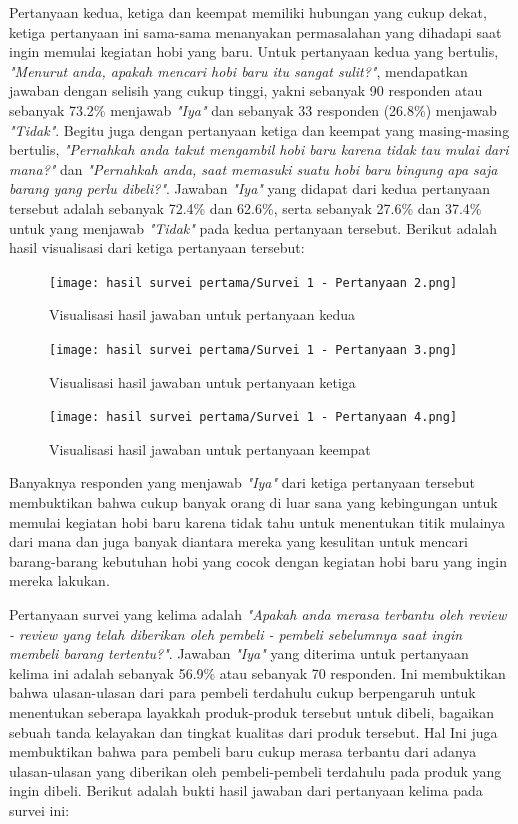 \documentclass[a4paper]{article}
\begin{document}
Pertanyaan kedua, ketiga dan keempat memiliki hubungan yang cukup dekat, ketiga pertanyaan ini sama-sama menanyakan permasalahan yang dihadapi saat ingin memulai kegiatan hobi yang baru. Untuk pertanyaan kedua yang bertulis, \textit{"Menurut anda, apakah mencari hobi baru itu sangat sulit?"}, mendapatkan jawaban dengan selisih yang cukup tinggi, yakni sebanyak 90 responden atau sebanyak 73.2\% menjawab \textit{"Iya"} dan sebanyak 33 responden (26.8\%) menjawab \textit{"Tidak"}. Begitu juga dengan pertanyaan ketiga dan keempat yang masing-masing bertulis, \textit{"Pernahkah anda takut mengambil hobi baru karena tidak tau mulai dari mana?"} dan \textit{"Pernahkah anda, saat memasuki suatu hobi baru bingung apa saja barang yang perlu dibeli?"}. Jawaban \textit{"Iya"} yang didapat dari kedua pertanyaan tersebut adalah sebanyak 72.4\% dan 62.6\%, serta sebanyak 27.6\% dan 37.4\% untuk yang menjawab \textit{"Tidak"} pada kedua pertanyaan tersebut. Berikut adalah hasil visualisasi dari ketiga pertanyaan tersebut:
\begin{figure}[h]
    \centering
    \texttt{[image: hasil survei pertama/Survei 1 - Pertanyaan 2.png]}
    \caption{Visualisasi hasil jawaban untuk pertanyaan kedua}
\end{figure}

\begin{figure}[h]
    \centering
    \texttt{[image: hasil survei pertama/Survei 1 - Pertanyaan 3.png]}
    \caption{Visualisasi hasil jawaban untuk pertanyaan ketiga}
\end{figure}

\begin{figure}[h]
    \centering
    \texttt{[image: hasil survei pertama/Survei 1 - Pertanyaan 4.png]}
    \caption{Visualisasi hasil jawaban untuk pertanyaan keempat}
\end{figure}
\newpage

Banyaknya responden yang menjawab \textit{"Iya"} dari ketiga pertanyaan tersebut membuktikan bahwa cukup banyak orang di luar sana yang kebingungan untuk memulai kegiatan hobi baru karena tidak tahu untuk menentukan titik mulainya dari mana dan juga banyak diantara mereka yang kesulitan untuk mencari barang-barang kebutuhan hobi yang cocok dengan kegiatan hobi baru yang ingin mereka lakukan.

Pertanyaan survei yang kelima adalah \textit{"Apakah anda merasa terbantu oleh review - review yang telah diberikan oleh pembeli - pembeli sebelumnya saat ingin membeli barang tertentu?"}. Jawaban \textit{"Iya"} yang diterima untuk pertanyaan kelima ini adalah sebanyak 56.9\% atau sebanyak 70 responden. Ini membuktikan bahwa ulasan-ulasan dari para pembeli terdahulu cukup berpengaruh untuk menentukan seberapa layakkah produk-produk tersebut untuk dibeli, bagaikan sebuah tanda kelayakan dan tingkat kualitas dari produk tersebut. Hal Ini juga membuktikan bahwa para pembeli baru cukup merasa terbantu dari adanya ulasan-ulasan yang diberikan oleh pembeli-pembeli terdahulu pada produk yang ingin dibeli. Berikut adalah bukti hasil jawaban dari pertanyaan kelima pada survei ini:
\end{document}

